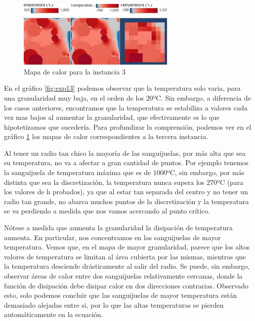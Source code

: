 \begin{figure}[h]
    \centering
    \includegraphics[width=0.685\textwidth]{Ejemplo Instancia 3}
    \caption{Mapa de calor para la instancia 3}
    \label{fig:exp13-vis}
\end{figure}

En el gráfico \ref{fig:exp13} podemos observar que la temperatura solo varia, para una granularidad muy baja, en el orden de los $20$ºC. Sin embargo, a diferencia de los casos anteriores, encontramos que la temperatura se estabiliza a valores cada vez mas bajos al aumentar la granularidad, que efectivamente es lo que hipotetizamos que sucedería. Para profundizar la comprensión, podemos ver en el gráfico \ref{fig:exp13-vis} los mapas de calor correspondientes a la tercera instancia.

Al tener un radio tan chico la mayoría de las sanguijuelas, por más alta que sea su temperatura, no va a afectar a gran cantidad de puntos. Por ejemplo tenemos la sanguijuela de temperatura máxima que es de $1000$ºC, sin embargo,  por más distinta que sea la discretización, la temperatura nunca supera los $270$ºC (para los valores de h probados), ya que al estar tan separada del centro y no tener un radio tan grande, no abarca muchos puntos de la discretización y la temperatura se va perdiendo a medida que nos vamos acercando al punto crítico.

Nótese a medida que aumenta la granularidad la disipación de temperatura aumenta. En particular, nos concentramos en las sanguijuelas de mayor temperatura. Vemos que, en el mapa de mayor granularidad, parece que los altos valores de temperatura se limitan al área cubierta por las mismas, mientras que la temperatura desciende drásticamente al salir del radio. Se puede, sin embargo, observar áreas de calor entre dos sanguijuelas relativamente cercanas, donde la función de disipación debe disipar calor en dos direcciones contrarias. Observado esto, solo podemos concluir que las sanguijuelas de mayor temperatura están demasiado alejadas entre si, por lo que las altas temperaturas se pierden automáticamente en la ecuación.

